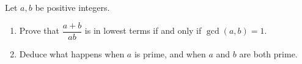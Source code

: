 Let $a,b$ be positive integers.
\begin{enumerate}
\item[(a)] Prove that $\dfrac{a+b}{ab}$ is in lowest terms if and only if $\gcd(a,b)=1$.
\item[(b)] Deduce what happens when $a$ is prime, and when $a$ and $b$ are both prime.
\end{enumerate}
